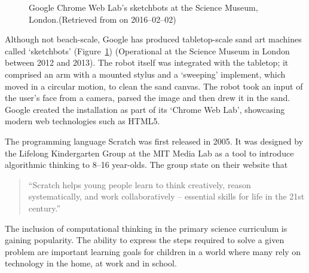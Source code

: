        \begin{figure}
          \begin{center}
          \end{center}
          \caption{Google Chrome Web Lab's sketchbots at the Science Museum, London.{\small (Retrieved from  on 2016--02--02)}}
          \label{fig: sketchbots}
        \end{figure}
        Although not beach-scale, Google has produced tabletop-scale sand art machines called `sketchbots' (Figure~\ref{fig: sketchbots}) (Operational at the Science Museum in London between 2012 and 2013).\cite{Warman2012} The robot itself was integrated with the tabletop; it comprised an arm with a mounted stylus and a `sweeping' implement, which moved in a circular motion, to clean the sand canvas. The robot took an input of the user's face from a camera, parsed the image and then drew it in the sand. Google  created the installation as part of its `Chrome Web Lab', showcasing modern web technologies such as HTML5.

\label{education review}
    The programming language Scratch was first released in 2005. It was designed by the Lifelong Kindergarten Group at the MIT Media Lab as a tool to introduce algorithmic thinking to 8--16 year-olds.\cite{scratch} The group state on their website that
    \begin{quotation}
        ``Scratch helps young people learn to think creatively, reason systematically, and work collaboratively -- essential skills for life in the 21st century.''
    \end{quotation}
    The inclusion of computational thinking in the primary science curriculum is gaining popularity. The ability to express the steps required to solve a given problem are important learning goals for children in a world where many rely on technology in the home, at work and in school.

